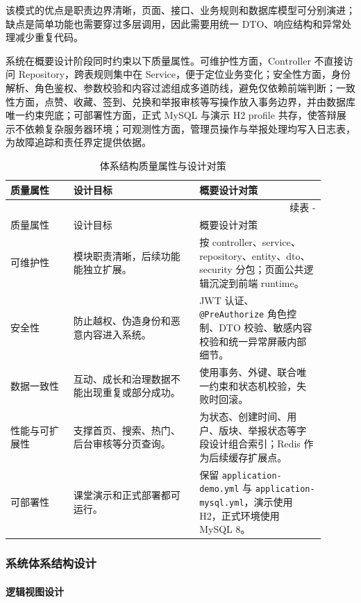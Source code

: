 \documentclass[UTF8,zihao=-4,a4paper]{ctexart}
\renewcommand{\thetable}{\thesection-\arabic{table}}
\begin{document}
该模式的优点是职责边界清晰，页面、接口、业务规则和数据库模型可分别演进；缺点是简单功能也需要穿过多层调用，因此需要用统一 DTO、响应结构和异常处理减少重复代码。

系统在概要设计阶段同时约束以下质量属性。可维护性方面，Controller 不直接访问 Repository，跨表规则集中在 Service，便于定位业务变化；安全性方面，身份解析、角色鉴权、参数校验和内容过滤组成多道防线，避免仅依赖前端判断；一致性方面，点赞、收藏、签到、兑换和举报审核等写操作放入事务边界，并由数据库唯一约束兜底；可部署性方面，正式 MySQL 与演示 H2 profile 共存，使答辩展示不依赖复杂服务器环境；可观测性方面，管理员操作与举报处理均写入日志表，为故障追踪和责任界定提供依据。

\begin{longtable}{L{0.18\linewidth}L{0.36\linewidth}L{0.36\linewidth}}
\caption{体系结构质量属性与设计对策}\\
\toprule
质量属性 & 设计目标 & 概要设计对策 \\
\midrule
\endfirsthead
\multicolumn{3}{r}{续表 \thetable}\\
\toprule
质量属性 & 设计目标 & 概要设计对策 \\
\midrule
\endhead
\bottomrule
\endfoot
可维护性 & 模块职责清晰，后续功能能独立扩展。 & 按 controller、service、repository、entity、dto、security 分包；页面公共逻辑沉淀到前端 runtime。\\
安全性 & 防止越权、伪造身份和恶意内容进入系统。 & JWT 认证、\texttt{@PreAuthorize} 角色控制、DTO 校验、敏感内容校验和统一异常屏蔽内部细节。\\
数据一致性 & 互动、成长和治理数据不能出现重复或部分成功。 & 使用事务、外键、联合唯一约束和状态机校验，失败时回滚。\\
性能与可扩展性 & 支撑首页、搜索、热门、后台审核等分页查询。 & 为状态、创建时间、用户、版块、举报状态等字段设计组合索引；Redis 作为后续缓存扩展点。\\
可部署性 & 课堂演示和正式部署都可运行。 & 保留 \texttt{application-demo.yml} 与 \texttt{application-mysql.yml}，演示使用 H2，正式环境使用 MySQL 8。\\
\end{longtable}

\subsubsection{系统体系结构设计}

\paragraph{逻辑视图设计}
\end{document}
